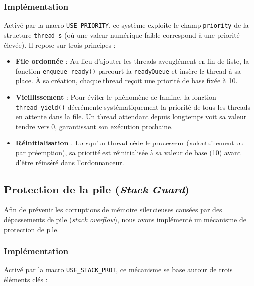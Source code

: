 \subsubsection{Implémentation}

Activé par la macro \texttt{USE\_PRIORITY}, ce système exploite le champ \texttt{priority} de la structure \texttt{thread\_s} (où une valeur numérique faible correspond à une priorité élevée). Il repose sur trois principes :

\begin{itemize}
    \item \textbf{File ordonnée} : Au lieu d'ajouter les threads aveuglément en fin de liste, la fonction \texttt{enqueue\_ready()} parcourt la \texttt{readyQueue} et insère le thread à sa place. À sa création, chaque thread reçoit une priorité de base fixée à 10.
    \item \textbf{Vieillissement} : Pour éviter le phénomène de famine, la fonction \texttt{thread\_yield()} décrémente systématiquement la priorité de tous les threads en attente dans la file. Un thread attendant depuis longtemps voit sa valeur tendre vers 0, garantissant son exécution prochaine.
    \item \textbf{Réinitialisation} : Lorsqu'un thread cède le processeur (volontairement ou par préemption), sa priorité est réinitialisée à sa valeur de base (10) avant d'être réinséré dans l'ordonnanceur.
\end{itemize}


\subsection{Protection de la pile (\textit{Stack Guard})}

Afin de prévenir les corruptions de mémoire silencieuses causées par des dépassements de pile (\textit{stack overflow}), nous avons implémenté un mécanisme de protection de pile.

\subsubsection{Implémentation}

Activé par la macro \texttt{USE\_STACK\_PROT}, ce mécanisme se base autour de trois éléments clés :

